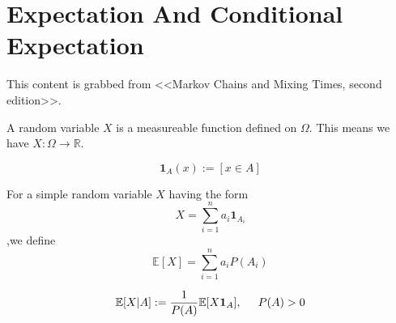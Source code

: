 \section{Expectation And Conditional Expectation}
\begin{remark}
  This content is grabbed from <<Markov Chains and Mixing Times, second edition>>.
\end{remark}
\begin{define}
  A random variable $X$ is a measureable function defined on $\Omega$.
  This means we have $X:\Omega\to\mathbb{R}$.
\end{define}
\begin{define}
  \[\mathbf{1}_A(x) := [x\in A]\]
\end{define}
\begin{define}[expectation]
  For a simple random variable $X$ having the form
  \[X = \sum_{i=1}^n a_i\mathbf{1}_{A_i}\]
  ,we define
  \[\mathbb{E}[X] = \sum_{i=1}^n a_iP(A_i)\]
\end{define}
\begin{define}
  \[\mathbb{E}[X|A] := \frac{1}{P(A)} \mathbb{E}[X\mathbf{1}_A],\hspace{0.5cm} P(A)>0\]
\end{define}
